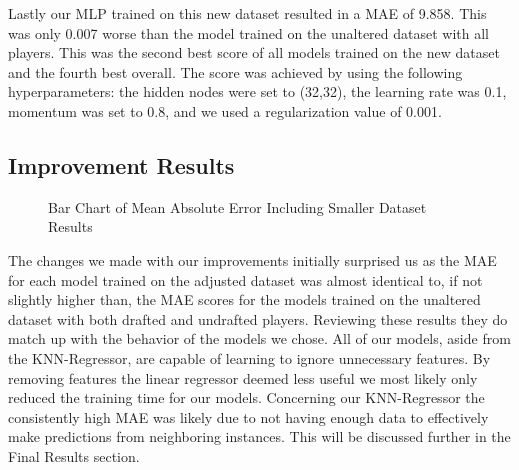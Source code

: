 \documentclass{article}
\begin{document}
Lastly our MLP trained on this new dataset resulted in a MAE of 9.858. This was
only 0.007 worse than the model trained on the unaltered dataset with all
players. This was the second best score of all models trained on the new dataset
and the fourth best overall. The score was achieved by using the following
hyperparameters: the hidden nodes were set to (32,32), the learning rate was
0.1, momentum was set to 0.8, and we used a regularization value of 0.001.

\subsection{Improvement Results}

\begin{figure}
	\begin{center}
    \caption{Bar Chart of Mean Absolute Error Including Smaller Dataset Results}
    \label{fig:improved_results}
	\end{center}
\end{figure}

The changes we made with our improvements initially surprised us as the MAE for
each model trained on the adjusted dataset was almost identical to, if not
slightly higher than, the MAE scores for the models trained on the unaltered
dataset with both drafted and undrafted players. Reviewing these results they do
match up with the behavior of the models we chose. All of our models, aside from
the KNN-Regressor, are capable of learning to ignore unnecessary features. By
removing features the linear regressor deemed less useful we most likely only
reduced the training time for our models. Concerning our KNN-Regressor the
consistently high MAE was likely due to not having enough data to effectively
make predictions from neighboring instances. This will be discussed further in
the Final Results section.
\end{document}
